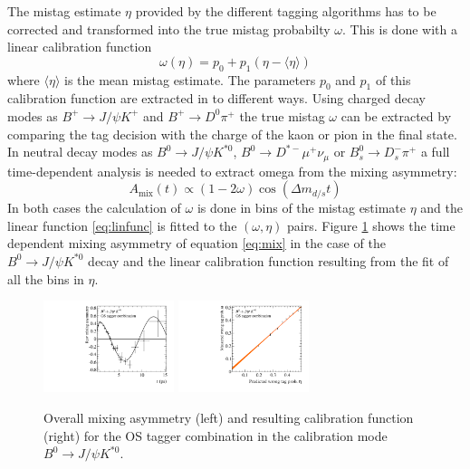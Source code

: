 \documentclass{PoS}
\begin{document}
The mistag estimate $\eta$ provided by the different tagging algorithms has to be corrected and transformed into the true mistag probabilty $\omega$. This is done with a linear calibration function
\begin{equation}
\omega(\eta)=p_0+p_1\left(\eta-\langle\eta\rangle\right)\label{eq:linfunc}
\end{equation}
where $\langle\eta\rangle$ is the mean mistag estimate. The parameters $p_0$ and $p_1$ of this calibration function are extracted in to different ways. Using charged decay modes as $B^+\to J\!/\!\psi K^+$ and $B^+\to D^0\pi^+$ the true mistag $\omega$ can be extracted by comparing the tag decision with the charge of the kaon or pion in the final state. In neutral decay modes as $B^0\to J\!/\!\psi K^{*0}$, $B^0\to D^{*-}\mu^+\nu_\mu$ or $B_s^0\to D_s^-\pi^+$ a full time-dependent analysis is needed to extract omega from the mixing asymmetry:
\begin{equation}
A_\text{mix}(t)\propto\left(1-2\omega\right)\cos\left(\Delta m_{d/s} t\right)\label{eq:mix}
\end{equation}
In both cases the calculation of $\omega$ is done in bins of the mistag estimate $\eta$ and the linear function \ref{eq:linfunc} is fitted to the $(\omega,\eta)$ pairs. Figure \ref{fig:calibration} shows the time dependent mixing asymmetry of equation \ref{eq:mix} in the case of the $B^0\to J\!/\!\psi K^{*0}$ decay and the linear calibration function resulting from the fit of all the bins in $\eta$.\\ 
\begin{figure}[htbp]
	\begin{center}
		\includegraphics[width=0.34\textwidth, angle=0]{figs/KstAsym.pdf}
		\includegraphics[width=0.34\textwidth, angle=0]{figs/Bd2JpsiKst-Kst-OST-8ScalingFunction_raw.pdf}
		\small{\caption{Overall mixing asymmetry (left) and resulting calibration function (right) for the OS tagger combination in the calibration mode $B^0\to J\!/\!\psi K^{*0}$.}}
		\label{fig:calibration}
	\end{center}
\end{figure}
\end{document}
